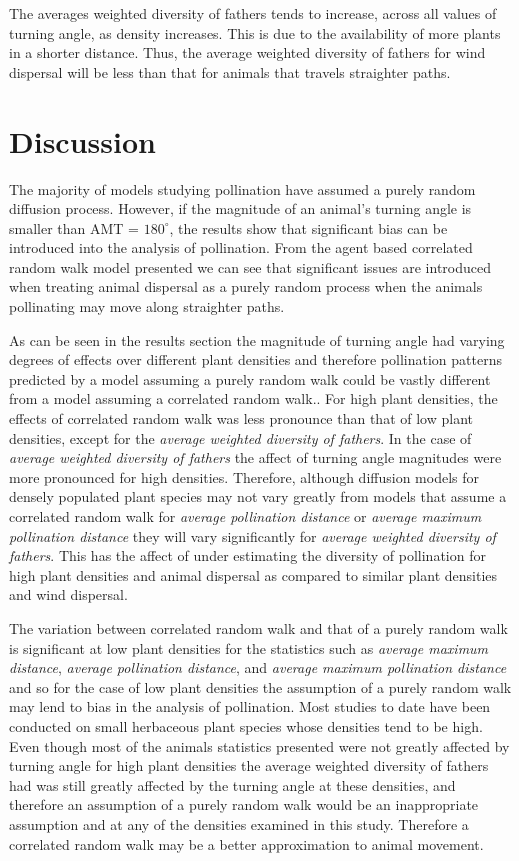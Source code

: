 \documentclass[preprint,12pt]{elsarticle}
\numberwithin{equation}{subsection}
\begin{document}
The averages weighted diversity of fathers tends to increase, across all values
of turning angle, as density increases. This is due to the availability of more
plants in a shorter distance. Thus, the average weighted diversity of fathers for
wind dispersal will be less than that for animals that travels straighter paths.

\section{{\bf Discussion}}
The majority of models studying pollination have assumed a purely random
diffusion process. However, if the magnitude of an animal's turning angle is
smaller than AMT = $180^\circ$, the results show that significant bias can be
introduced into the analysis of pollination. From the agent based correlated
random walk model presented we can see that significant issues are introduced
when treating animal dispersal as a purely random process when the animals
pollinating may move along straighter paths.

As can be seen in the results section the magnitude of turning angle had varying
degrees of effects over different plant densities and therefore pollination
patterns predicted by a model assuming a purely random walk could be vastly
different from a model assuming a correlated random walk.. For high plant
densities, the effects of correlated random walk was less pronounce than that of
low plant densities, except for the \emph{average weighted diversity of
fathers}. In the case of \emph{average weighted diversity of fathers} the affect
of turning angle magnitudes were more pronounced for high densities. Therefore,
although diffusion models for densely populated plant species may not vary
greatly from models that assume a correlated random walk for \emph{average
pollination distance} or \emph{average maximum pollination distance} they will
vary significantly for \emph{average weighted diversity of fathers}. This has
the affect of under estimating the diversity of pollination for high plant
densities and animal dispersal as compared to similar plant densities and wind
dispersal.

The variation between correlated random walk and that of a purely random walk is
significant at low plant densities for the statistics such as \emph{average
maximum distance}, \emph{average pollination distance}, and \emph{average
maximum pollination distance} and so for the case of low plant densities the
assumption of a purely random walk may lend to bias in the analysis of
pollination. Most studies to date have been conducted on small herbaceous plant
species whose densities tend to be high. Even though most of the animals
statistics presented were not greatly affected by turning angle for high plant
densities the average weighted diversity of fathers had was still greatly
affected by the turning angle at these densities, and therefore an assumption of
a purely random walk would be an inappropriate assumption and at any of the
densities examined in this study. Therefore a correlated random walk may be a
better approximation to animal movement.
\end{document}

